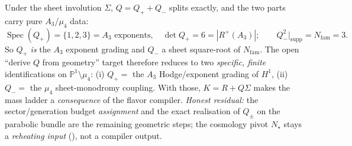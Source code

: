 \documentclass[11pt,a4paper]{article}
\newcommand{\Nfam}{N_{\mathrm{fam}}}
\theoremstyle{definition}
\begin{document}
\begin{keybox}
Under the sheet involution $\Sigma$, $Q=Q_+ + Q_-$ splits exactly, and the two
parts carry pure $A_3$/$\mu_4$ data:
\begin{equation}
  \operatorname{Spec}(Q_+)=\{1,2,3\}=\text{$A_3$ exponents},\quad \det Q_+=6=|R^+(A_3)|;
  \qquad Q_-^2\big|_{\mathrm{supp}}=\Nfam=3 .
\end{equation}
So $Q_+$ \emph{is} the $A_3$ exponent grading and $Q_-$ a sheet square-root of
$\Nfam$. The open ``derive $Q$ from geometry'' target therefore reduces to two
\emph{specific, finite} identifications on $\mathbb P^1\setminus\mu_4$:
(i) $Q_+ =$ the $A_3$ Hodge/exponent grading of $H^1$, (ii) $Q_- =$ the $\mu_4$
sheet-monodromy coupling. With those, $K=R+Q\Sigma$ makes the mass ladder a
\emph{consequence} of the flavor compiler. \emph{Honest residual:} the
sector/generation budget \emph{assignment} and the exact realisation of
$Q_\pm$ on the parabolic bundle are the remaining geometric steps; the cosmology
pivot $N_\star$ stays a \emph{reheating input} (\mC), not a compiler output.
\end{keybox}
\end{document}

